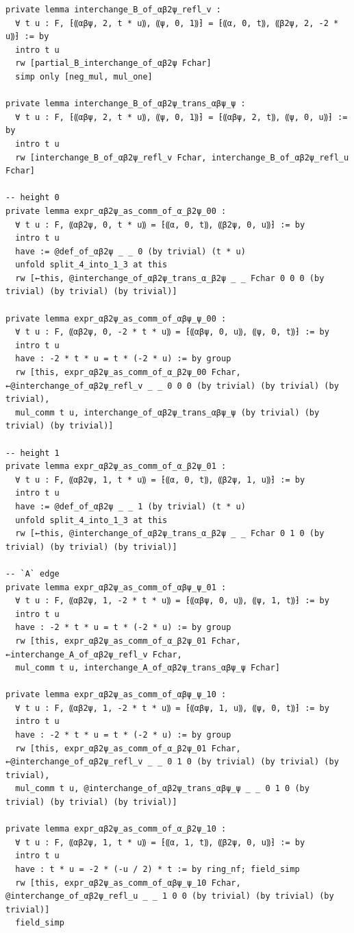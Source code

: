 \begin{Verbatim}
private lemma interchange_B_of_αβ2ψ_refl_v :
  ∀ t u : F, ⁅⸨αβψ, 2, t * u⸩, ⸨ψ, 0, 1⸩⁆ = ⁅⸨α, 0, t⸩, ⸨β2ψ, 2, -2 * u⸩⁆ := by
  intro t u
  rw [partial_B_interchange_of_αβ2ψ Fchar]
  simp only [neg_mul, mul_one]

private lemma interchange_B_of_αβ2ψ_trans_αβψ_ψ :
  ∀ t u : F, ⁅⸨αβψ, 2, t * u⸩, ⸨ψ, 0, 1⸩⁆ = ⁅⸨αβψ, 2, t⸩, ⸨ψ, 0, u⸩⁆ := by
  intro t u
  rw [interchange_B_of_αβ2ψ_refl_v Fchar, interchange_B_of_αβ2ψ_refl_u Fchar]

-- height 0
private lemma expr_αβ2ψ_as_comm_of_α_β2ψ_00 :
  ∀ t u : F, ⸨αβ2ψ, 0, t * u⸩ = ⁅⸨α, 0, t⸩, ⸨β2ψ, 0, u⸩⁆ := by
  intro t u
  have := @def_of_αβ2ψ _ _ 0 (by trivial) (t * u)
  unfold split_4_into_1_3 at this
  rw [←this, @interchange_of_αβ2ψ_trans_α_β2ψ _ _ Fchar 0 0 0 (by trivial) (by trivial) (by trivial)]

private lemma expr_αβ2ψ_as_comm_of_αβψ_ψ_00 :
  ∀ t u : F, ⸨αβ2ψ, 0, -2 * t * u⸩ = ⁅⸨αβψ, 0, u⸩, ⸨ψ, 0, t⸩⁆ := by
  intro t u
  have : -2 * t * u = t * (-2 * u) := by group
  rw [this, expr_αβ2ψ_as_comm_of_α_β2ψ_00 Fchar, ←@interchange_of_αβ2ψ_refl_v _ _ 0 0 0 (by trivial) (by trivial) (by trivial),
  mul_comm t u, interchange_of_αβ2ψ_trans_αβψ_ψ (by trivial) (by trivial) (by trivial)]

-- height 1
private lemma expr_αβ2ψ_as_comm_of_α_β2ψ_01 :
  ∀ t u : F, ⸨αβ2ψ, 1, t * u⸩ = ⁅⸨α, 0, t⸩, ⸨β2ψ, 1, u⸩⁆ := by
  intro t u
  have := @def_of_αβ2ψ _ _ 1 (by trivial) (t * u)
  unfold split_4_into_1_3 at this
  rw [←this, @interchange_of_αβ2ψ_trans_α_β2ψ _ _ Fchar 0 1 0 (by trivial) (by trivial) (by trivial)]

-- `A` edge
private lemma expr_αβ2ψ_as_comm_of_αβψ_ψ_01 :
  ∀ t u : F, ⸨αβ2ψ, 1, -2 * t * u⸩ = ⁅⸨αβψ, 0, u⸩, ⸨ψ, 1, t⸩⁆ := by
  intro t u
  have : -2 * t * u = t * (-2 * u) := by group
  rw [this, expr_αβ2ψ_as_comm_of_α_β2ψ_01 Fchar, ←interchange_A_of_αβ2ψ_refl_v Fchar,
  mul_comm t u, interchange_A_of_αβ2ψ_trans_αβψ_ψ Fchar]

private lemma expr_αβ2ψ_as_comm_of_αβψ_ψ_10 :
  ∀ t u : F, ⸨αβ2ψ, 1, -2 * t * u⸩ = ⁅⸨αβψ, 1, u⸩, ⸨ψ, 0, t⸩⁆ := by
  intro t u
  have : -2 * t * u = t * (-2 * u) := by group
  rw [this, expr_αβ2ψ_as_comm_of_α_β2ψ_01 Fchar, ←@interchange_of_αβ2ψ_refl_v _ _ 0 1 0 (by trivial) (by trivial) (by trivial),
  mul_comm t u, @interchange_of_αβ2ψ_trans_αβψ_ψ _ _ 0 1 0 (by trivial) (by trivial) (by trivial)]

private lemma expr_αβ2ψ_as_comm_of_α_β2ψ_10 :
  ∀ t u : F, ⸨αβ2ψ, 1, t * u⸩ = ⁅⸨α, 1, t⸩, ⸨β2ψ, 0, u⸩⁆ := by
  intro t u
  have : t * u = -2 * (-u / 2) * t := by ring_nf; field_simp
  rw [this, expr_αβ2ψ_as_comm_of_αβψ_ψ_10 Fchar, @interchange_of_αβ2ψ_refl_u _ _ 1 0 0 (by trivial) (by trivial) (by trivial)]
  field_simp


\end{Verbatim}
